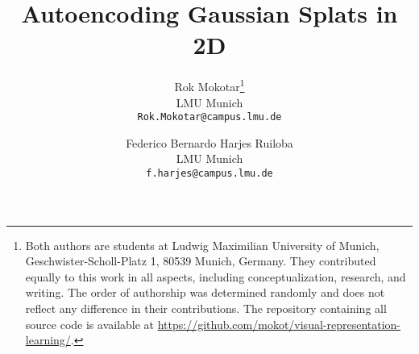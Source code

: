 \documentclass[10pt,twocolumn,letterpaper]{article}
\title{Autoencoding Gaussian Splats in 2D}
\author{Rok Mokotar\thanks{Both authors are students at Ludwig Maximilian University of Munich, Geschwister-Scholl-Platz 1, 80539 Munich, Germany. They contributed equally to this work in all aspects, including conceptualization, research, and writing. The order of authorship was determined randomly and does not reflect any difference in their contributions. The repository containing all source code is available at \url{https://github.com/mokot/visual-representation-learning/}.}\\
LMU Munich\\
{\tt\small Rok.Mokotar@campus.lmu.de}
\and
Federico Bernardo Harjes Ruiloba\footnotemark[1]\\
LMU Munich\\
{\tt\small f.harjes@campus.lmu.de}
}
\begin{document}
\maketitle







{
    \small
    
    
}

\end{document}
